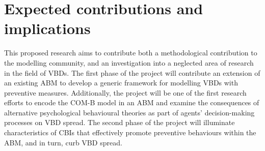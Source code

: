 \section{Expected contributions and implications}

This proposed research aims to contribute both a methodological contribution to the modelling community, and an investigation into a neglected area of research in the field of VBDs. The first phase of the project will contribute an extension of an existing ABM to develop a generic framework for modelling VBDs with preventive measures. Additionally, the project will be one of the first research efforts to encode the \mbox{COM-B} model in an ABM and examine the consequences of alternative psychological behavioural theories as part of agents' decision-making processes on VBD spread. The second phase of the project will illuminate characteristics of CBIs that effectively promote preventive behaviours within the ABM, and in turn, curb VBD spread.